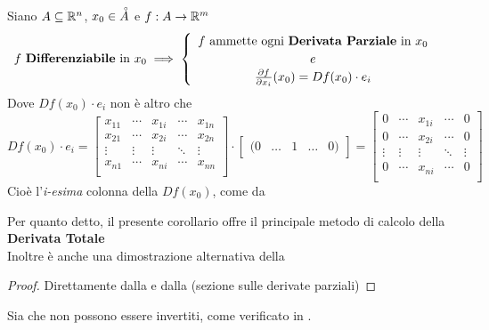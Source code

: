 \begin{corollary}
	\label{coro:se_diff_deriv_parz}
	Siano $A \subseteq \mathbb{R}^n$, $x_0 \in \accentset{\circ}{A}$ e $f:A \to \mathbb{R}^m$
	\[
		f \text{ \textbf{Differenziabile} in } x_0
		\implies
		\begin{cases}
			\begin{array}{c}
				f \text{ ammette ogni \textbf{Derivata Parziale} in } x_0\\
				e\\
				\frac{\partial f}{\partial x_i}(x_0) = Df(x_0) \cdot e_i
			\end{array}
		\end{cases}
	\]
	Dove $Df(x_0) \cdot e_i$ non è altro che
	\[
		Df(x_0) \cdot e_i =
		\begin{bmatrix}
			x_{11} & \cdots & x_{1i} & \cdots & x_{1n}\\
			x_{21} & \cdots & x_{2i} & \cdots & x_{2n}\\
			\vdots & \vdots & \vdots & \ddots & \vdots\\
			x_{n1} & \cdots & x_{ni} & \cdots & x_{nn}\\
		\end{bmatrix}
		\cdot
		\begin{bmatrix}
			(0 & \dots & 1 & \dots & 0)
		\end{bmatrix}
		=
		\begin{bmatrix}
			0 & \cdots & x_{1i} & \cdots & 0\\
			0 & \cdots & x_{2i} & \cdots & 0\\
			\vdots & \vdots & \vdots & \ddots & \vdots\\
			0 & \cdots & x_{ni} & \cdots & 0\\
		\end{bmatrix}
	\]
	Cioè l'\textit{i-esima} colonna della $Df(x_0)$, come da 
	\begin{note}
		Per quanto detto, il presente corollario offre il principale metodo di calcolo della \textbf{Derivata Totale}\\
		Inoltre è anche una dimostrazione alternativa della 
	\end{note}
	\begin{proof}
		Direttamente dalla  e dalla  (sezione sulle derivate parziali)
	\end{proof}
\end{corollary}
\begin{observation}
	Sia  che  non possono essere invertiti, come verificato in .
\end{observation}
